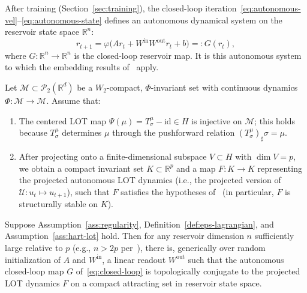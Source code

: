 \documentclass[11pt]{article}
\newcommand{\R}{\mathbb{R}}
\newcommand{\1}{\mathbf{1}}
\begin{document}
After training (Section~\ref{sec:training}), the closed-loop
iteration~\eqref{eq:autonomous-vel}--\eqref{eq:autonomous-state} defines
an autonomous dynamical system on the reservoir state space $\R^n$:
\begin{equation}\label{eq:closed-loop}
  r_{t+1} = \varphi\bigl(A r_t + W^{\mathrm{in}} W^{\mathrm{out}} r_t + b\bigr)
  =: G(r_t),
\end{equation}
where $G: \R^n \to \R^n$ is the closed-loop reservoir map. It is this
autonomous system to which the embedding results of~\cite{Hart_2020} apply.

\begin{assumption}\label{ass:hart-lot}
Let $\mathcal{M} \subset \mathcal{P}_2(\R^d)$ be a $W_2$-compact,
$\Phi$-invariant set with continuous dynamics
$\Phi: \mathcal{M} \to \mathcal{M}$. Assume that:
\begin{enumerate}[label=(\roman*)]
  \item The centered LOT map $\Psi(\mu) = T_\sigma^\mu - \mathrm{id} \in H$ is injective on $\mathcal{M}$; this holds because $T_\sigma^\mu$ determines $\mu$ through the pushforward relation $(T_\sigma^\mu)_\sharp\sigma=\mu$.
  \item After projecting onto a finite-dimensional subspace $V \subset H$
        with $\dim V = p$, we obtain a compact invariant set $K \subset
        \R^p$ and a map $F: K \to K$ representing the projected
        autonomous LOT dynamics (i.e., the projected version of
        $\mathcal{U}: u_t \mapsto u_{t+1}$), such that $F$ satisfies the
        hypotheses of~\cite[Theorems~2.3.7 and~2.4.13]{Hart_2020} (in
        particular, $F$ is structurally stable on $K$).
\end{enumerate}
\end{assumption}

\begin{corollary}
\label{cor:esn-approx}
Suppose Assumption~\ref{ass:regularity},
Definition~\ref{def:eps-lagrangian}, and Assumption~\ref{ass:hart-lot}
hold. Then for any reservoir dimension $n$ sufficiently large relative to
$p$ (e.g., $n > 2p$ per~\cite[Theorems~2.3.7
and~2.4.13]{Hart_2020}), there is, generically over
random initialization of $A$ and $W^{\mathrm{in}}$, a linear readout
$W^{\mathrm{out}}$ such that the autonomous closed-loop map $G$
of~\eqref{eq:closed-loop} is topologically conjugate to the projected LOT
dynamics $F$ on a compact attracting set in reservoir state space.
\end{corollary}
\end{document}
